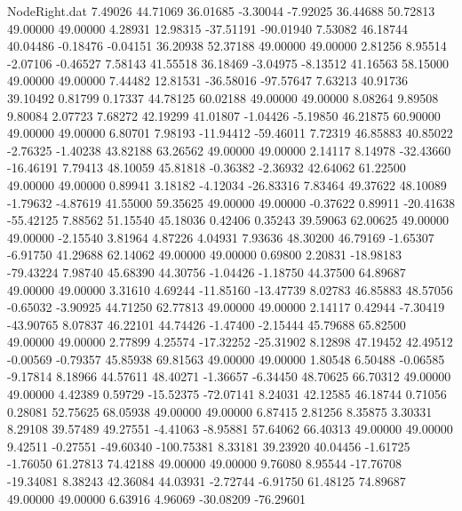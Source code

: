 \begin{filecontents}{NodeRight.dat}
   7.49026   44.71069   36.01685    -3.30044   -7.92025   36.44688   50.72813   49.00000   49.00000    4.28931   12.98315  -37.51191  -90.01940
   7.53082   46.18744   40.04486    -0.18476   -0.04151   36.20938   52.37188   49.00000   49.00000    2.81256    8.95514   -2.07106   -0.46527
   7.58143   41.55518   36.18469    -3.04975   -8.13512   41.16563   58.15000   49.00000   49.00000    7.44482   12.81531  -36.58016  -97.57647
   7.63213   40.91736   39.10492     0.81799    0.17337   44.78125   60.02188   49.00000   49.00000    8.08264    9.89508    9.80084    2.07723
   7.68272   42.19299   41.01807    -1.04426   -5.19850   46.21875   60.90000   49.00000   49.00000    6.80701    7.98193  -11.94412  -59.46011
   7.72319   46.85883   40.85022    -2.76325   -1.40238   43.82188   63.26562   49.00000   49.00000    2.14117    8.14978  -32.43660  -16.46191
   7.79413   48.10059   45.81818    -0.36382   -2.36932   42.64062   61.22500   49.00000   49.00000    0.89941    3.18182   -4.12034  -26.83316
   7.83464   49.37622   48.10089    -1.79632   -4.87619   41.55000   59.35625   49.00000   49.00000   -0.37622    0.89911  -20.41638  -55.42125
   7.88562   51.15540   45.18036     0.42406    0.35243   39.59063   62.00625   49.00000   49.00000   -2.15540    3.81964    4.87226    4.04931
   7.93636   48.30200   46.79169    -1.65307   -6.91750   41.29688   62.14062   49.00000   49.00000    0.69800    2.20831  -18.98183  -79.43224
   7.98740   45.68390   44.30756    -1.04426   -1.18750   44.37500   64.89687   49.00000   49.00000    3.31610    4.69244  -11.85160  -13.47739
   8.02783   46.85883   48.57056    -0.65032   -3.90925   44.71250   62.77813   49.00000   49.00000    2.14117    0.42944   -7.30419  -43.90765
   8.07837   46.22101   44.74426    -1.47400   -2.15444   45.79688   65.82500   49.00000   49.00000    2.77899    4.25574  -17.32252  -25.31902
   8.12898   47.19452   42.49512    -0.00569   -0.79357   45.85938   69.81563   49.00000   49.00000    1.80548    6.50488   -0.06585   -9.17814
   8.18966   44.57611   48.40271    -1.36657   -6.34450   48.70625   66.70312   49.00000   49.00000    4.42389    0.59729  -15.52375  -72.07141
   8.24031   42.12585   46.18744     0.71056    0.28081   52.75625   68.05938   49.00000   49.00000    6.87415    2.81256    8.35875    3.30331
   8.29108   39.57489   49.27551    -4.41063   -8.95881   57.64062   66.40313   49.00000   49.00000    9.42511   -0.27551  -49.60340 -100.75381
   8.33181   39.23920   40.04456    -1.61725   -1.76050   61.27813   74.42188   49.00000   49.00000    9.76080    8.95544  -17.76708  -19.34081
   8.38243   42.36084   44.03931    -2.72744   -6.91750   61.48125   74.89687   49.00000   49.00000    6.63916    4.96069  -30.08209  -76.29601

\end{filecontents}
